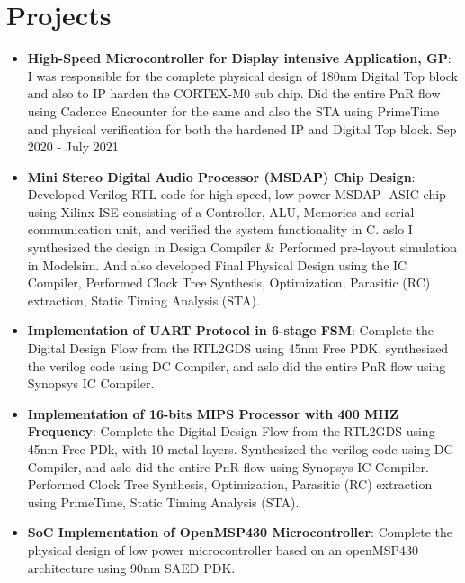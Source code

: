 \documentclass[a4paper,20pt]{article}
\newcommand{\resumeItem}[2]{
  \item\small{
    \textbf{#1}{: #2 \vspace{-2pt}}
  }
}
\newcommand{\resumeSubItem}[2]{\resumeItem{#1}{#2}\vspace{-3pt}}
\newcommand{\resumeSubHeadingListStart}{\begin{itemize}[leftmargin=*]}
\newcommand{\resumeSubHeadingListEnd}{\end{itemize}}
\begin{document}
\vspace{-5pt}
\section{Projects}
\resumeSubHeadingListStart
\resumeSubItem{High-Speed Microcontroller for Display intensive Application, GP}{I was responsible for the complete physical design of 180nm Digital Top block and also to IP harden the CORTEX-M0 sub chip. Did the entire PnR flow using Cadence Encounter for the same and also the STA using PrimeTime and physical verification for both the hardened IP and Digital Top block.} \hspace{13cm} {Sep 2020 - July 2021}
\vspace{2pt}
\resumeSubItem{Mini Stereo Digital Audio Processor (MSDAP) Chip Design}{Developed Verilog RTL code for high speed, low power MSDAP- ASIC chip using Xilinx ISE consisting of a Controller, ALU, Memories and serial communication unit, and verified the system functionality in C. aslo I synthesized the design in Design Compiler \& Performed pre-layout simulation in Modelsim. And also developed Final Physical Design using the IC Compiler, Performed Clock Tree Synthesis, Optimization, Parasitic (RC) extraction, Static Timing Analysis (STA).} \hspace{7.3cm}{Jan 2021 - Mar2021}
\vspace{2pt}
\resumeSubItem{Implementation of UART Protocol in 6-stage FSM}{Complete the Digital Design Flow from the RTL2GDS using 45nm Free PDK. synthesized the verilog code using DC Compiler, and aslo did the entire PnR flow using Synopsys IC Compiler.}
\vspace{2pt}
\resumeSubItem{Implementation of 16-bits MIPS Processor with 400 MHZ Frequency}{Complete the Digital Design Flow from the RTL2GDS using 45nm Free PDk, with 10 metal layers. Synthesized the verilog code using DC Compiler, and aslo did the entire PnR flow using Synopsys IC Compiler. Performed Clock Tree Synthesis, Optimization, Parasitic (RC) extraction using PrimeTime, Static Timing Analysis (STA).} \hspace{7.8cm}{Jan 2021 - Mar2021}
\vspace{2pt}
\resumeSubItem{SoC Implementation of OpenMSP430 Microcontroller}{Complete the physical design of low power microcontroller based on an openMSP430 architecture using 90nm SAED PDK.}\hspace{4.9cm}{Dec 2021 - Jan 2022}
\resumeSubHeadingListEnd
\end{document}
